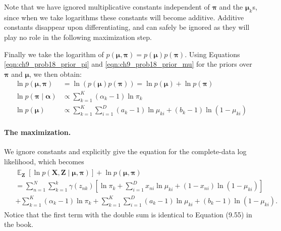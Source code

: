 \documentclass[12pt, a4paper]{article}
\newcommand{\vect}[1]{\bm{#1}}
\DeclareMathOperator{\E}{\mathbb{E}}
\begin{document}
Note that we have ignored multiplicative constants independent of $\vect{\pi}$ and the $\vect{\mu}_k$s, since when we take logarithms these constants will become additive.
Additive constants disappear upon differentiating, and can safely be ignored as they will play no role in the following maximization step.

Finally we take the logarithm of $p(\vect{\mu}, \vect{\pi}) = p(\vect{\mu}) p(\vect{\pi})$.
Using Equations \eqref{eqn:ch9_prob18_prior_pi} and \eqref{eqn:ch9_prob18_prior_mu} for the priors over $\vect{\pi}$ and $\vect{\mu}$, we then obtain:
\begin{align*}
	\ln p(\vect{\mu}, \vect{\pi}) &= \ln \left( p(\vect{\mu}) p(\vect{\pi}) \right) = \ln p(\vect{\mu}) + \ln p(\vect{\pi}) \\
	\ln  p(\vect{\pi} \mid \vect{\alpha}) & \propto \sum_{k=1}^{K} (\alpha_k - 1) \ln \pi_k \\
	\ln p(\vect{\mu}) & \propto   
	\sum_{k=1}^{K}
	\sum_{i=1}^{D}
	(a_k - 1) \ln \mu_{ki}
	+
	(b_k - 1) \ln (1 - \mu_{ki})
\end{align*}


\paragraph{The maximization.} 
We ignore constants and explicitly give the equation for the complete-data log likelihood, which becomes
\begin{align}
\begin{split}
\label{eqn:ch9_prob18_complete_ll_exp}
&\E_{\vect{Z}} \left[ \ln p (\vect{X}, \vect{Z} \mid \vect{\mu}, \vect{\pi})  \right]
+
\ln p(\vect{\mu}, \vect{\pi}) \\
&= 
	\sum_{n=1}^{N}
	\sum_{k=1}^{k}
	\gamma(z_{nk})
	\left[ 
	\ln \pi_k
	+
	\sum_{i=1}^{D}
	x_{ni} \ln \mu_{ki} + (1- x_{ni}) \ln (1 - \mu_{ki})
	 \right] \\
	 &+ \sum_{k=1}^{K} (\alpha_k - 1) \ln \pi_k
	 + 
	 \sum_{k=1}^{K}
	 \sum_{i=1}^{D}
	 (a_k - 1) \ln \mu_{ki}
	 +
	 (b_k - 1) \ln (1 - \mu_{ki}).
	 \end{split}
\end{align}
Notice that the first term with the double sum is identical to Equation (9.55) in the book.
\end{document}
